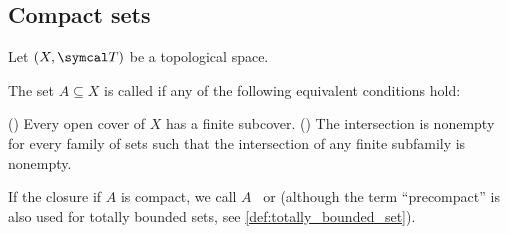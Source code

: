 \subsection{Compact sets}\label{subsec:compact_sets}

Let \( (X, \Cal{T}) \) be a topological space.

\begin{definition}\label{def:compact_set}\cite[40]{Deimling1985}
  The set \( A \subseteq X \) is called  if any of the following equivalent conditions hold:
  \begin{defenum}
     () Every open cover of \( X \) has a finite subcover.
     () The intersection is nonempty for every family of sets such that the intersection of any finite subfamily is nonempty.
  \end{defenum}

  If the closure if \( A \) is compact, we call \( A \)~ or  (although the term \enquote{precompact} is also used for totally bounded sets, see \ref{def:totally_bounded_set}).
\end{definition}
